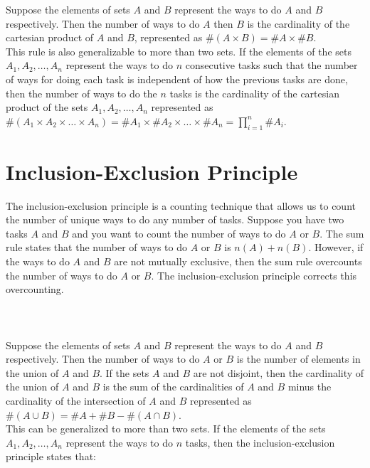\documentclass[a4paper]{exam}
\begin{document}
    Suppose the elements of sets $A$ and $B$ represent the ways to do $A$ and $B$ respectively. Then the number of ways to do $A$ then $B$ is the cardinality of the cartesian product of $A$ and $B$, represented as $\#(A \times B) = \#A \times \#B$.\\
    This rule is also generalizable to more than two sets. If the elements of the sets $A_1, A_2, \ldots, A_n$ represent the ways to do $n$ consecutive tasks such that the number of ways for doing each task is independent of how the previous tasks are done, then the number of ways to do the $n$ tasks is the cardinality of the cartesian product of the sets $A_1, A_2, \ldots, A_n$ represented as $\#(A_1 \times A_2 \times \ldots \times A_n) = \#A_1 \times \#A_2 \times \ldots \times \#A_n = \prod_{i=1}^n\#A_i$.
    
\section*{Inclusion-Exclusion Principle}
    The inclusion-exclusion principle is a counting technique that allows us to count the number of unique ways to do any number of tasks. Suppose you have two tasks $A$ and $B$ and you want to count the number of ways to do $A$ or $B$. The sum rule states that the number of ways to do $A$ or $B$ is $n(A) + n(B)$. However, if the ways to do $A$ and $B$ are not mutually exclusive, then the sum rule overcounts the number of ways to do $A$ or $B$. The inclusion-exclusion principle corrects this overcounting.\\\\
    \noindent{}\\\\

    Suppose the elements of sets $A$ and $B$ represent the ways to do $A$ and $B$ respectively. Then the number of ways to do $A$ or $B$ is the number of elements in the union of $A$ and $B$. If the sets $A$ and $B$ are not disjoint, then the cardinality of the union of $A$ and $B$ is the sum of the cardinalities of $A$ and $B$ minus the cardinality of the intersection of $A$ and $B$ represented as $\#(A \cup B) = \#A + \#B - \#(A \cap B)$.\\
    This can be generalized to more than two sets. If the elements of the sets $A_1, A_2, \ldots, A_n$ represent the ways to do $n$ tasks, then the inclusion-exclusion principle states that:\\\\
    \noindent{}
\end{document}
